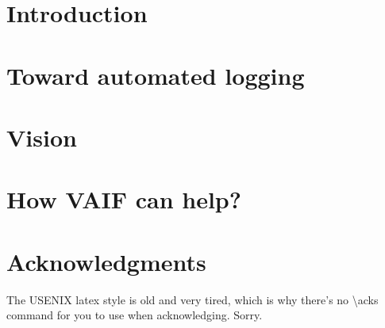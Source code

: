 \begin{abstract}

\end{abstract}


\section{Introduction}




\section{Toward automated logging}



\section{Vision}




\section{How VAIF can help?}



\section*{Acknowledgments}

The USENIX latex style is old and very tired, which is why
there's no \textbackslash{}acks command for you to use when
acknowledging. Sorry.






